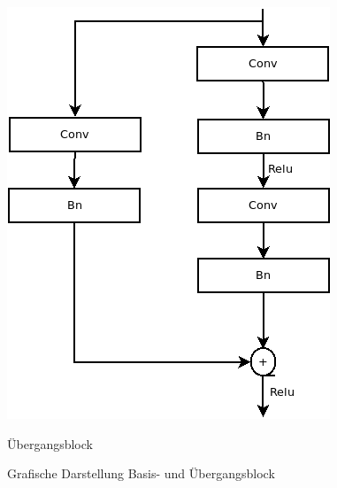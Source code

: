 \begin{figure}[h]
\begin{minipage}[b]{.4\linewidth}
      \includegraphics[width=0.8\linewidth]{KapitelPartB/Images/Ubergangsblock.png}
      \caption{Übergangsblock}
   \end{minipage}
   \caption{Grafische Darstellung Basis- und Übergangsblock}
   \label{abb:blocks}
\end{figure}

